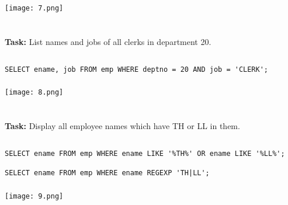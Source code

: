 \documentclass[12pt,a4paper]{article}
\begin{document}
\subsubsection{}
\begin{center}
    \texttt{[image: 7.png]}
\end{center}


\section{}
\textbf{Task:} List names and jobs of all clerks in department 20.

\subsection{}
\begin{lstlisting}
SELECT ename, job FROM emp WHERE deptno = 20 AND job = 'CLERK';

\end{lstlisting}

\subsubsection{}
\begin{center}
    \texttt{[image: 8.png]}
\end{center}


\section{}
\textbf{Task:} Display all employee names which have TH or LL in them.

\subsection{}
\begin{lstlisting}
SELECT ename FROM emp WHERE ename LIKE '%TH%' OR ename LIKE '%LL%';

SELECT ename FROM emp WHERE ename REGEXP 'TH|LL';

\end{lstlisting}

\subsubsection{}
\begin{center}
    \texttt{[image: 9.png]}
\end{center}
\end{document}
